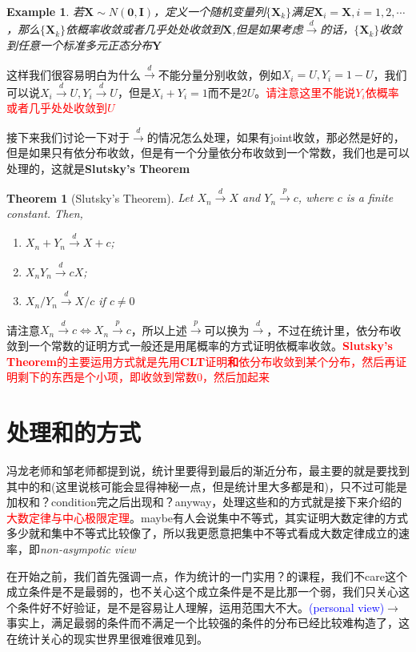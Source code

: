 \documentclass{article}
\newtheorem{theorem}{Theorem}[section]
\newtheorem{example}{Example}[section]
\begin{document}
\begin{example}
	若$\bm{X}\sim N(\bm{0},\bm{I})$，定义一个随机变量列$\{\bm{X}_k\}$满足$\bm{X}_i=\bm{X}, i=1,2,\cdots$，那么$\{\bm{X}_k\}$依概率收敛或者几乎处处收敛到$\bm{X}$,但是如果考虑$\stackrel{d}{\rightarrow}$的话，$\{\bm{X}_k\}$收敛到任意一个标准多元正态分布$\bm{Y}$
\end{example}
这样我们很容易明白为什么$\stackrel{d}{\rightarrow}$不能分量分别收敛，例如$X_i=U,Y_i=1-U$，我们可以说$X_i\stackrel{d}{\rightarrow}U,Y_i\stackrel{d}{\rightarrow}U$，但是$X_i+Y_i=1$而不是$2U$。\textcolor{red}{请注意这里不能说$Y_i$依概率或者几乎处处收敛到$U$}
\par 接下来我们讨论一下对于$\stackrel{d}{\rightarrow}$的情况怎么处理，如果有joint收敛，那必然是好的，但是如果只有依分布收敛，但是有一个分量依分布收敛到一个常数，我们也是可以处理的，这就是\textbf{Slutsky's Theorem}
\begin{theorem}[Slutsky's Theorem]
	Let $X_n \stackrel{d}{\rightarrow} X$ and $Y_n \stackrel{p}{\rightarrow} c$, where $c$ is a finite constant. Then,
		\begin{enumerate}
			\item $X_n+Y_n \stackrel{d}{\rightarrow} X+c$;
			\item $X_n Y_n \stackrel{d}{\rightarrow} c X$;
			\item $X_n / Y_n \stackrel{d}{\rightarrow} X / c$ if $c \neq 0$
		\end{enumerate}
\end{theorem}
请注意$X_n\stackrel{d}{\rightarrow}c \Leftrightarrow X_n\stackrel{p}{\rightarrow}c$，所以上述$\stackrel{p}{\rightarrow}$可以换为$\stackrel{d}{\rightarrow}$，不过在统计里，依分布收敛到一个常数的证明方式一般还是用尾概率的方式证明依概率收敛。\textcolor{red}{\textbf{Slutsky's Theorem}的主要运用方式就是先用\textbf{CLT}证明\textbf{和}依分布收敛到某个分布，然后再证明剩下的东西是个小项，即收敛到常数0，然后加起来}
\section{处理和的方式}
冯龙老师和邹老师都提到说，统计里要得到最后的渐近分布，最主要的就是要找到其中的和(这里说核可能会显得神秘一点，但是统计里大多都是和)，只不过可能是加权和？condition完之后出现和？anyway，处理这些和的方式就是接下来介绍的\textcolor{red}{大数定律与中心极限定理}。maybe有人会说集中不等式，其实证明大数定律的方式多少就和集中不等式比较像了，所以我更愿意把集中不等式看成大数定律成立的速率，即\textit{non-asympotic view}
\par 在开始之前，我们首先强调一点，作为统计的一门实用？的课程，我们不care这个成立条件是不是最弱的，也不关心这个成立条件是不是比那一个弱，我们只关心这个条件好不好验证，是不是容易让人理解，运用范围大不大。\textcolor{blue}{(personal view)}$\to$事实上，满足最弱的条件而不满足一个比较强的条件的分布已经比较难构造了，这在统计关心的现实世界里很难很难见到。
\end{document}
